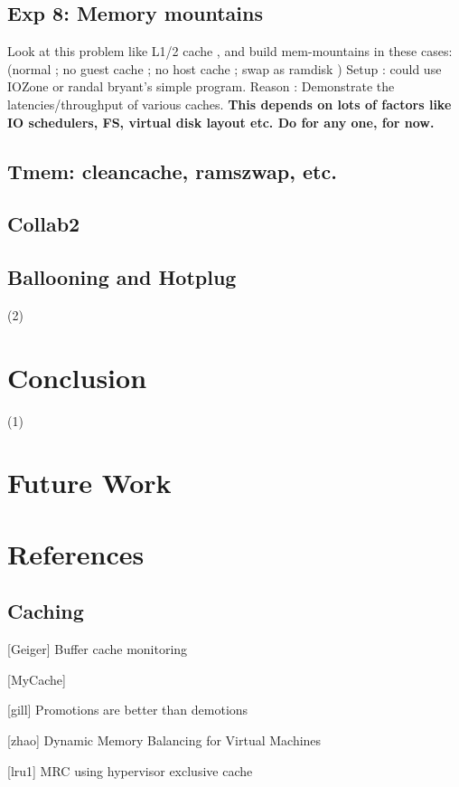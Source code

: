 \documentclass[10pt,a4paper]{article}
\begin{document}
\subsection{Exp 8: Memory mountains}

Look at this problem like L1/2 cache , and build mem-mountains in these cases:
(normal ; no guest cache ; no host cache ; swap as ramdisk )
Setup : could use IOZone or randal bryant's simple program.
Reason : Demonstrate the latencies/throughput of various caches. 
\textbf{This depends on lots of factors like IO schedulers, FS, virtual disk layout etc. Do for any one, for now.}

\subsection{Tmem: cleancache, ramszwap, etc.}

\subsection{Collab2}

\subsection{Ballooning and Hotplug}

   (2)
\section{Conclusion}

   (1)
\section{Future Work}

  
\section{References}


\subsection{Caching}

[Geiger] Buffer cache monitoring 

[MyCache]

[gill] Promotions are better than demotions

[zhao] Dynamic Memory Balancing for Virtual Machines

[lru1] MRC using hypervisor exclusive cache
\end{document}
